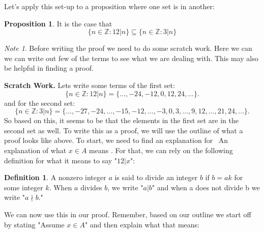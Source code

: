 \documentclass{amsart} %
\theoremstyle{definition} %
\newtheorem*{dfn}{Definition} %
\theoremstyle{proposition} %
\newtheorem*{prpn}{Proposition}
\theoremstyle{remark} %
\newtheorem*{note}{Note}
\begin{document}
\smallskip
Let's apply this set-up to a proposition where one set is in another:

\begin{prpn}
It is the case that \[ \{n \in \mathbb{Z} : 12 | n \} \subseteq \{n \in \mathbb{Z}: 3 | n \} \]
\end{prpn}

\medskip
\begin{note}
Before writing the proof we need to do some scratch work. Here we can we can write out few of the terms to see what we are dealing with. This may also be helpful in finding a proof.
\end{note}

\noindent \textbf{Scratch Work.} Lets write some terms of the first set: \[ \{n \in \mathbb{Z} : 12|n \} = \{\dots,-24, -12, 0, 12, 24, \dots \}. \] and for the second set: \[ \{n \in \mathbb{Z}:3|n \} = \{\dots, -27, -24, \dots, -15, -12, \dots, -3, 0, 3, \dots, 9, 12, \dots, 21, 24, \dots \}. \]
So based on this, it seems to be that the elements in the first set are in the second set as well. To write this as a proof, we will use the outline of what a proof looks like above. To start, we need to find an explanation for \guillemotleft\ An explanation of what $ x \in A$ means \guillemotright. For that, we can rely on the following definition for what it means to say "$12 | x$":

\begin{dfn}
 \quad A nonzero integer $a$ is said to divide an integer $b$ if $b = ak$ for some integer $k$. When $a$ divides $b$, we write "$a | b$" and when a does not divide b we write "$a \nmid b$."
\end{dfn}

We can now use this in our proof. Remember, based on our outline we start off by stating "Assume $x \in A$" and then explain what that means:
\end{document}
